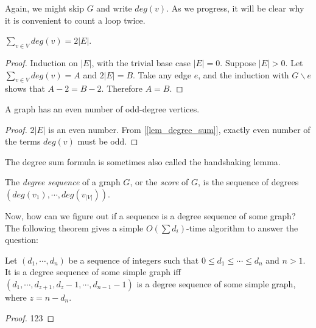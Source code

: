         Again, we might skip $G$ and write $deg(v)$. As we progress, it will be clear why it is convenient to count a loop twice.
        
        \begin{lemma} \label{lem_degree_sum}
            $\sum_{v \in V}deg(v) = 2|E|$.
        \end{lemma}
        
        \begin{proof}
            Induction on $|E|$, with the trivial base case $|E| = 0$. Suppose $|E| > 0$. Let $\sum_{v \in V}deg(v) = A$ and $2|E| = B$. Take any edge $e$, and the induction with $G\backslash e$ shows that $A-2 = B-2$. Therefore $A=B$.
        \end{proof}
        
        \begin{lemma}
            A graph has an even number of odd-degree vertices.
        \end{lemma}
        
        \begin{proof}
            $2|E|$ is an even number. From [\ref{lem_degree_sum}], exactly even number of the terms $deg(v)$ must be odd.
        \end{proof}
        
        The degree sum formula is sometimes also called the handshaking lemma.
        
        \begin{defn} \label{def_graph_score}
            The \emph{degree sequence} of a graph $G$, or the \emph{score} of $G$, is the sequence of degrees $(deg(v_1),\cdots,deg(v_{|V|}))$.
        \end{defn}
        
        Now, how can we figure out if a sequence is a degree sequence of some graph? The following theorem gives a simple $O(\sum d_i)$-time algorithm to answer the question:
        
        \begin{thm} \label{thm_havel_hakimi}
            Let $(d_1,\cdots,d_n)$ be a sequence of integers such that $0 \leq d_1 \leq \cdots \leq d_n$ and $n>1$. It is a degree sequence of some simple graph iff $(d_1,\cdots,d_{z+1},d_z-1,\cdots,d_{n-1}-1)$ is a degree sequence of some simple graph, where $z = n-d_n$.
        \end{thm}
        
        \begin{proof}
            123
        \end{proof}
    
